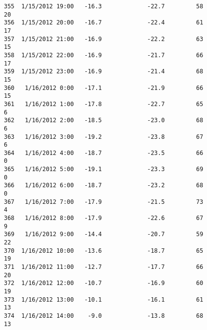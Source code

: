 \documentclass[11pt]{article}
\begin{document}
\begin{tcolorbox}[breakable, size=fbox, boxrule=.5pt, pad at break*=1mm, opacityfill=0]
\begin{Verbatim}[commandchars=\\\{\}]
355  1/15/2012 19:00   -16.3             -22.7         58               20
356  1/15/2012 20:00   -16.7             -22.4         61               17
357  1/15/2012 21:00   -16.9             -22.2         63               15
358  1/15/2012 22:00   -16.9             -21.7         66               17
359  1/15/2012 23:00   -16.9             -21.4         68               15
360   1/16/2012 0:00   -17.1             -21.9         66               15
361   1/16/2012 1:00   -17.8             -22.7         65                6
362   1/16/2012 2:00   -18.5             -23.0         68                6
363   1/16/2012 3:00   -19.2             -23.8         67                6
364   1/16/2012 4:00   -18.7             -23.5         66                0
365   1/16/2012 5:00   -19.1             -23.3         69                0
366   1/16/2012 6:00   -18.7             -23.2         68                0
367   1/16/2012 7:00   -17.9             -21.5         73                4
368   1/16/2012 8:00   -17.9             -22.6         67                9
369   1/16/2012 9:00   -14.4             -20.7         59               22
370  1/16/2012 10:00   -13.6             -18.7         65               19
371  1/16/2012 11:00   -12.7             -17.7         66               20
372  1/16/2012 12:00   -10.7             -16.9         60               19
373  1/16/2012 13:00   -10.1             -16.1         61               13
374  1/16/2012 14:00    -9.0             -13.8         68               13


\end{Verbatim}
\end{tcolorbox}
\end{document}

